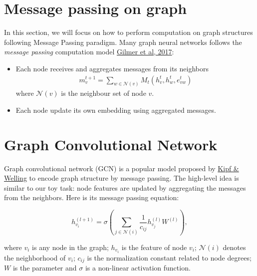 \section{Message passing on graph}
 In this section, we will focus on how to perform computation on graph structures following Message Passing paradigm. Many graph neural networks follows the \textit{message passing} computation model \href{https://arxiv.org/abs/1704.01212}{Gilmer et al, 2017}:
\begin{itemize}
    \item Each node receives and aggregates messages from its neighbors  
\begin{gather}
m_v^{t+1} = \sum\limits_{w\in \mathcal{N}(v)}M_t(h_v^t, h_w^t, e_{vw}^t)
\end{gather}
where $\mathcal{N}(v)$ is the neighbour set of node $v$.

\item Each node update its own embedding using aggregated messages.
\end{itemize}




\section{Graph Convolutional Network}

Graph convolutional network (GCN) is a popular model proposed by \href{https://arxiv.org/abs/1609.02907}{Kipf \& Welling} to encode graph structure by message passing. The high-level idea is similar to our toy task: node features are updated by aggregating the messages from the neighbors. Here is its message passing equation:

$$
h_{v_i}^{(l+1)} = \sigma \left(\sum_{j\in\mathcal{N}(i)}\frac{1}{c_{ij}}h_{v_j}^{(l)}W^{(l)} \right),
$$

where $v_i$ is any node in the graph; $h_{v_i}$ is the feature of node $v_i$; $\mathcal{N}(i)$ denotes the neighborhood of $v_i$; $c_{ij}$ is the normalization constant related to node degrees; $W$ is the parameter and $\sigma$ is a non-linear activation function.




